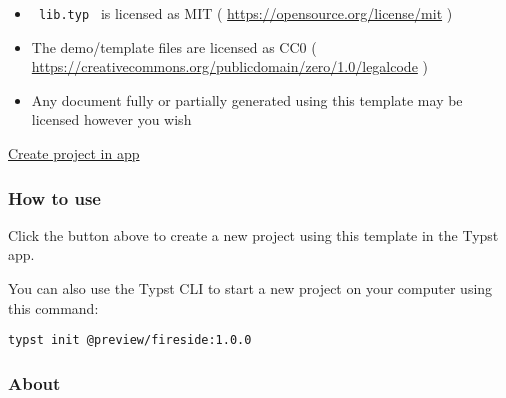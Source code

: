 \begin{Shaded}
\begin{Highlighting}[]
\end{Highlighting}
\end{Shaded}

\begin{itemize}
\tightlist
\item
  \texttt{\ lib.typ\ } is licensed as MIT (
  \url{https://opensource.org/license/mit} )
\item
  The demo/template files are licensed as CC0 (
  \url{https://creativecommons.org/publicdomain/zero/1.0/legalcode} )
\item
  Any document fully or partially generated using this template may be
  licensed however you wish
\end{itemize}

\href{/app?template=fireside&version=1.0.0}{Create project in app}

\subsubsection{How to use}\label{how-to-use}

Click the button above to create a new project using this template in
the Typst app.

You can also use the Typst CLI to start a new project on your computer
using this command:

\begin{verbatim}
typst init @preview/fireside:1.0.0
\end{verbatim}



\subsubsection{About}\label{about}

